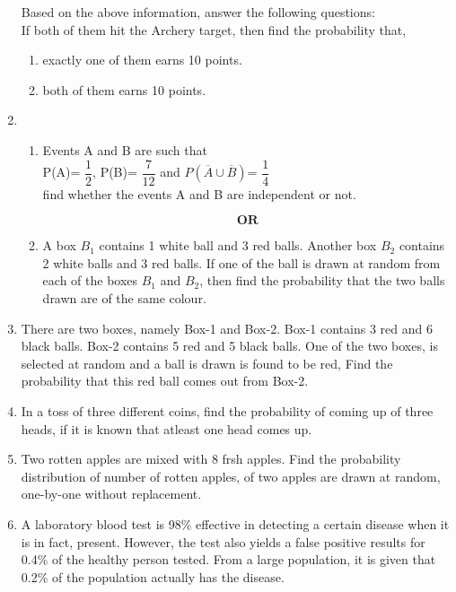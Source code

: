 \documentclass[a4paper,12pt]{article}
\begin{document}
\begin{enumerate}
Based on the above information, answer the following questions: \\
If both of them hit the Archery target, then find the probability that,\
\begin{enumerate}
\item exactly one of them earns 10 points. 

\item both of them earns 10 points.

\end{enumerate}

\item \begin{enumerate}
\item Events A and B are such that\\
P(A)= $\dfrac{1}{2}$, P(B)= $\dfrac{7}{12}$ and $P(\overline A \cup \overline B)$= $\dfrac{1}{4}$ \\
find whether the events A and B are independent  or not. 

$$ \textbf{OR} $$

\item A box $B_1$ contains 1 white ball and 3 red balls. Another box  $B_2$ contains 2 white balls and 3 red balls. If one of the ball is drawn at random from each of the boxes  $B_1$ and  $B_2$, then find the probability that the two balls drawn are of the same colour.
\end{enumerate}

\item There are two boxes, namely Box-1 and Box-2. Box-1 contains 3 red and 6 black balls. Box-2 contains 5 red and 5 black balls. One of the two boxes, is selected at random and a ball is drawn is found to be red, Find the probability that this red ball comes out from Box-2.

\item In a toss of  three different coins, find the probability of coming up of three heads, if it is known that atleast one  head comes up.

\item Two rotten apples are mixed with 8 frsh apples. Find the probability distribution of number of rotten apples, of two apples are drawn at random, one-by-one without replacement.

\item A laboratory blood test is 98\% effective in detecting a certain disease when it is in fact, present. However, the test also yields a false positive results for 0.4\% of the healthy person tested. From a large population, it is given that 0.2\% of the population actually has the disease.\


\end{enumerate}
\end{document}
